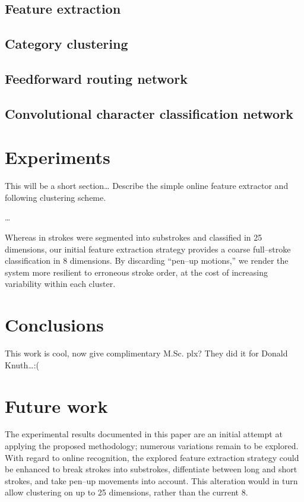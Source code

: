 \documentclass[10pt,conference,a4paper]{IEEEtran}
\begin{document}
	\subsection{Feature extraction}

	\subsection{Category clustering}

	\subsection{Feedforward routing network}

	\subsection{Convolutional character classification network}


	\section{Experiments}

	This will be a short section\ldots
	Describe the simple online feature extractor and following clustering scheme.

	\ldots

	Whereas in \cite{nakai2001substroke} strokes were segmented into substrokes and classified in
	25 dimensions, our initial feature extraction strategy provides a coarse full--stroke classification
	in 8 dimensions. By discarding ``pen--up motions,'' we render the system more resilient to erroneous
	stroke order, at the cost of increasing variability within each cluster.


	\section{Conclusions}

	This work is cool, now give complimentary M.Sc. plx?
	They did it for Donald Knuth\ldots :(


	\section{Future work}

	The experimental results documented in this paper are an initial attempt at applying the proposed methodology;
	numerous variations remain to be explored. With regard to online recognition, the explored feature extraction
	strategy could be enhanced to break strokes into substrokes, diffentiate between long and short strokes, and take
	pen--up movements into account. This alteration would in turn allow clustering on up to 25 dimensions, rather than the current 8.
\end{document}

